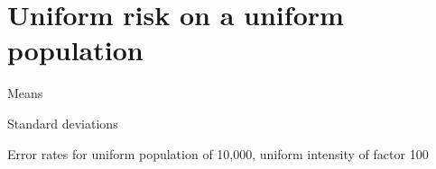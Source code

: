 

\section{Uniform risk on a uniform population}

\begin{table}[H]
\centering
\scriptsize

    \begin{subtable}{0.5\textwidth}
    
    \caption[]{Means} 
    \end{subtable}%
    \begin{subtable}{0.5\textwidth}
    
    \caption[]{Standard deviations} 
    \end{subtable}

\caption[]{Error rates for uniform population of 10,000, uniform intensity of factor 100}
\label{tbl:mean_error_rates:unif_100_unif}
\end{table}



